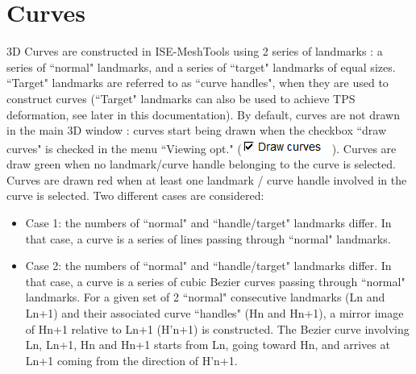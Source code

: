 \section{Curves}
3D Curves are constructed in ISE-MeshTools using 2 series of landmarks : a series of ``normal"
landmarks, and a series of ``target" landmarks of equal sizes. ``Target" landmarks are referred to as
``curve handles", when they are used to construct curves (``Target" landmarks can also be used to
achieve TPS deformation, see later in this documentation). By default, curves are not drawn in the
main 3D window : curves start being drawn when the checkbox ``draw curves" is checked in the menu
``Viewing opt." (\includegraphics[scale=0.7]{images/Landmarks/Draw_curves.png}). Curves are draw green when no landmark/curve handle belonging to
the curve is selected. Curves are drawn red when at least one landmark / curve handle involved in the
curve is selected. Two different cases are considered:
\begin{itemize}

\item Case 1: the numbers of ``normal" and ``handle/target" landmarks differ. In that case, a curve is a series of lines passing through ``normal" landmarks.
\item Case 2: the numbers of ``normal" and ``handle/target" landmarks differ. In that case, a curve is a
series of cubic Bezier curves passing through ``normal" landmarks. For a given set of 2 ``normal"
consecutive landmarks (Ln and Ln+1) and their associated curve ``handles" (Hn and Hn+1), a mirror
image of Hn+1 relative to Ln+1 (H'n+1) is constructed. The Bezier curve involving Ln, Ln+1, Hn and
Hn+1 starts from Ln, going toward Hn, and arrives at Ln+1 coming from the direction of H'n+1.

\end{itemize}


